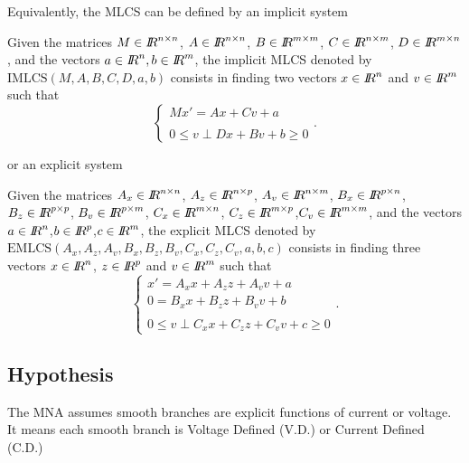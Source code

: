 Equivalently, the MLCS can be defined by an implicit system

\begin{definition} 
  Given the matrices  ${M} \in \mbox{\rm $I\!\!R$}^{n \times n}$, ${A} \in \mbox{\rm $I\!\!R$}^{n \times n}$, ${B} \in \mbox{\rm $I\!\!R$}^{m \times
  m}$, ${C} \in \mbox{\rm $I\!\!R$}^{n \times m}$, ${D} \in \mbox{\rm $I\!\!R$}^{m \times n}$, and the vectors  $ {a} \in \mbox{\rm $I\!\!R$}^n, {b}
  \in \mbox{\rm $I\!\!R$}^m$, the implicit MLCS denoted by $\mathrm{IMLCS}(M,A,B,C,D,a,b)$ consists in finding two vectors $ {x} \in \mbox{\rm $I\!\!R$}^n$ and  $ {v} \in \mbox{\rm $I\!\!R$}^m$ such that
\begin{equation}\label{eq:mlcs1} 
  \begin{cases}
   M x' = A x + C v + a  \\  \\
   {0} \le {v} \perp     Dx +B v +b   \ge {0}
  \end{cases}.
\end{equation}
\end{definition}

or an explicit system
\begin{definition} 
  Given the matrices   ${A_{x}} \in \mbox{\rm $I\!\!R$}^{n \times n}$, ${A_{z}} \in \mbox{\rm $I\!\!R$}^{n \times
  p}$, ${A_{v}} \in \mbox{\rm $I\!\!R$}^{n \times m}$, ${B_{x}} \in \mbox{\rm $I\!\!R$}^{p \times n}$, ${B_{z}} \in \mbox{\rm $I\!\!R$}^{p \times
  p}$, ${B_{v}} \in \mbox{\rm $I\!\!R$}^{p \times m}$, ${C_{x}} \in \mbox{\rm $I\!\!R$}^{m \times n}$, ${C_{z}} \in \mbox{\rm $I\!\!R$}^{m \times p}$,${C_{v}} \in \mbox{\rm $I\!\!R$}^{m \times m}$, and
  the vectors  $ {a} \in \mbox{\rm $I\!\!R$}^n$,$ {b}  \in \mbox{\rm $I\!\!R$}^p$,$ {c}  \in \mbox{\rm $I\!\!R$}^m$, the explicit MLCS denoted by
  $\mathrm{EMLCS}(A_{x},A_{z},A_{v},B_{x},B_{z},B_{v},C_{x},C_{z},C_{v},a,b,c)$ consists in finding three vectors $ {x}
  \in \mbox{\rm $I\!\!R$}^n$, $ {z} \in \mbox{\rm $I\!\!R$}^p$ and  $ {v} \in \mbox{\rm $I\!\!R$}^m$ such that
\begin{equation}\label{eq:mlcs2} 
  \begin{cases}
   x' = A_{x} x +A_{z} z +A_{v} v + a  \\
   0 = B_{x} x +B_{z} z + B_{v} v +b \\ \\
   {0} \le {v} \perp     C_{x} x+ C_{z}z +C_{v} v +c   \ge {0}
  \end{cases}.
\end{equation}
\end{definition}
\subsection{Hypothesis}
The MNA assumes smooth branches are explicit functions of current or voltage. It means each smooth
branch is Voltage Defined (V.D.) or Current Defined (C.D.)\\

